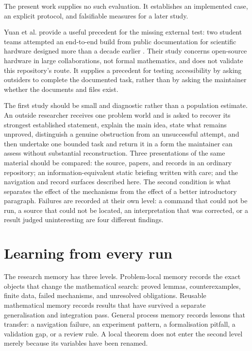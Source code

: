 \documentclass[10pt]{article}
\begin{document}
The present work supplies no such evaluation.  It establishes an implemented
case, an explicit protocol, and falsifiable measures for a later study.

Yuan et al. provide a useful precedent for the missing external test: two
student teams attempted an end-to-end build from public documentation for
scientific hardware designed more than a decade earlier
\cite{documentationtest}. Their study concerns open-source hardware in large
collaborations, not formal mathematics, and does not validate this repository's
route. It supplies a precedent for testing accessibility by asking outsiders
to complete the documented task, rather than by asking the maintainer whether
the documents and files exist.

The first study should be small and diagnostic rather than a population
estimate.  An outside researcher receives one problem world and is asked to
recover its strongest established statement, explain the main idea, state what
remains unproved, distinguish a genuine obstruction from an unsuccessful
attempt, and then undertake one bounded task and return it in a form the
maintainer can assess without substantial reconstruction.  Three presentations
of the same material should be compared: the source, papers, and records in an
ordinary repository; an information-equivalent static briefing written with
care; and the navigation and record surfaces described here.  The second
condition is what separates the effect of the mechanisms from the effect of a
better introductory paragraph.  Failures are recorded at their own level: a
command that could not be run, a source that could not be located, an
interpretation that was corrected, or a result judged uninteresting are four
different findings.

\section{Learning from every run}\label{sec:learning}

The research memory has three levels.  Problem-local memory records the exact
objects that change the mathematical search: proved lemmas, counterexamples,
finite data, failed mechanisms, and unresolved obligations.  Reusable
mathematical memory records results that have survived a separate
generalisation and integration pass.  General process memory records lessons
that transfer: a navigation failure, an experiment pattern, a formalisation
pitfall, a validation gap, or a review rule.  A local theorem does not enter
the second level merely because its variables have been renamed.
\end{document}
